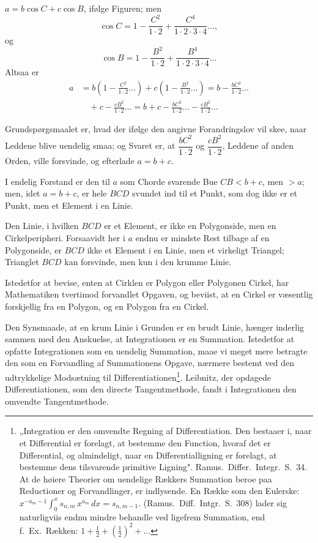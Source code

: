\documentclass[12pt]{book}
\newcommand{\opage}[1]{\marginnote{\footnotesize\textit{[#1]}}}
\begin{document}
$a = b\cos C + c\cos B$, ifølge Figuren; men
\[
\cos C = 1 - \frac{C^{2}}{1\cdot2} + \frac{C^{4}}{1\cdot2\cdot3\cdot4} \dots,
\]
og
\[
\cos B = 1 - \frac{B^{2}}{1\cdot2} + \frac{B^{4}}{1\cdot2\cdot3\cdot4} \dots
\]
\opage{71} Altsaa er
\[
\begin{aligned}
a &= b\left(1 - \frac{C^{2}}{1\cdot2} \dots\right)
+ c\left(1 - \frac{B^{2}}{1\cdot2} \dots\right)
= b - \frac{bC^{2}}{1\cdot2}\dots\\
&\quad {}+ c - \frac{cB^{2}}{1\cdot2}\dots
= b + c - \frac{bC^{2}}{1\cdot2}\dots - \frac{cB^{2}}{1\cdot2}\dots
\end{aligned}
\]

Grundspørgsmaalet er, hvad der ifølge den angivne Forandringslov vil skee, naar
Leddene blive uendelig smaa; og Svaret er, at $\dfrac{bC^{2}}{1\cdot2}$ og
$\dfrac{cB^{2}}{1\cdot2}$, Leddene af anden Orden, ville forsvinde, og efterlade
$a = b + c$.

I endelig Forstand er den til $a$ som Chorde svarende Bue $CB < b + c$, men $> a$;
men, idet $a = b + c$, er hele $BCD$ svundet ind til et Punkt, som dog ikke er et
Punkt, men et Element i en Linie.

Den Linie, i hvilken $BCD$ er et Element, er ikke en Polygonside, men en
Cirkelperipheri. Forsaavidt her i $a$ endnu er mindste Rest tilbage af en
Polygonside, er $BCD$ ikke et Element i en Linie, men et virkeligt Triangel;
Trianglet $BCD$ kan forsvinde, men kun i den krumme Linie.

Istedetfor at bevise, enten at Cirklen er Polygon eller Polygonen Cirkel, har
Mathematiken tvertimod forvandlet Opgaven, og beviist, at en Cirkel er væsentlig
forskjellig fra en Polygon, og en Polygon fra en Cirkel.

Den Synsmaade, at en krum Linie i Grunden er en brudt Linie, hænger inderlig sammen
med den Anskuelse, at Integrationen er en Summation. Istedetfor at opfatte
Integrationen som en uendelig Summation, maae vi meget mere betragte den som en
Forvandling af Summationens Opgave, nærmere bestemt ved den udtrykkelige Modsætning
til Differentiationen\footnote{„Integration er den omvendte Regning af
Differentiation. Den bestaaer i, naar et Differential er forelagt, at bestemme den
Function, hvoraf det er Differential, og almindeligt, naar en Differentialligning er
forelagt, at bestemme dens tilsvarende primitive Ligning". Ramus.\ Differ.\
Integr.\ S.\ 34. At de høiere Theorier om uendelige Rækkers Summation beroe paa
Reductioner og Forvandlinger, er indlysende. En Række som den Eulerske:
$x^{-a_{m}-1}\int_{0}^{x} s_{n,m}\,x^{a_{m}}\,dx = s_{n,m-1}$. (Ramus.\ Diff.\
Intgr.\ S.\ 308) lader sig naturligviis endnu mindre behandle ved ligefrem
Summation, end f.\ Ex.\ Rækken:
$1 + \frac{1}{2} + \left(\frac{1}{2}\right)^{2} + \dots$}.
\opage{72} Leibnitz, der opdagede Differentiationen, som den directe Tangentmethode, fandt i
Integrationen den omvendte Tangentmethode.
\end{document}
